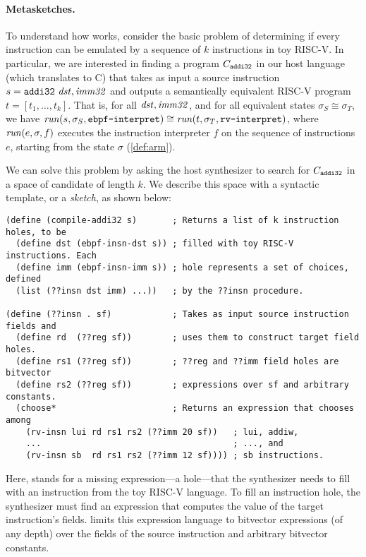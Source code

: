 \paragraph{Metasketches.} 

To understand how \jitsynth works, consider the basic problem of determining if
every  instruction can be emulated by a sequence of $k$ instructions
in toy RISC-V\@. In particular, we are interested in finding a program
$C_{\texttt{addi32}}$ in our host language (which \jitsynth translates to C) that
takes as input a source instruction $s = \texttt{addi32}\ \mathit{dst}, \mathit{imm32}$ and
outputs a semantically equivalent RISC-V program $t = [t_1,\ldots,t_k]$. That
is, for all $\mathit{dst}, \mathit{imm32}$, and for all equivalent states $\sigma_S \cong
\sigma_T$, we have $\mathit{run}(s, \sigma_S,
\texttt{ebpf-interpret})\cong\mathit{run}(t, \sigma_T, \texttt{rv-interpret})$, where
$\mathit{run}(e, \sigma, f)$ executes the instruction interpreter $f$ on the
sequence of instructions $e$, starting from the state $\sigma$
(\autoref{def:arm}).\tighten

We can solve this problem by asking the host synthesizer to search for
$C_{\texttt{addi32}}$ in a space of candidate \minicompilers of length $k$. We
describe this space with a syntactic template, or a \emph{sketch}, as shown below:

\begin{lstlisting}[language=rosette,xleftmargin=0em,mathescape=true,basicstyle=\scriptsize\ttfamily]
(define (compile-addi32 s)       ; Returns a list of k instruction holes, to be 
  (define dst (ebpf-insn-dst s)) ; filled with toy RISC-V instructions. Each    
  (define imm (ebpf-insn-imm s)) ; hole represents a set of choices, defined 
  (list (??insn dst imm) ...))   ; by the ??insn procedure. 

(define (??insn . sf)            ; Takes as input source instruction fields and
  (define rd  (??reg sf))        ; uses them to construct target field holes. 
  (define rs1 (??reg sf))        ; ??reg and ??imm field holes are bitvector 
  (define rs2 (??reg sf))        ; expressions over sf and arbitrary constants.
  (choose*                       ; Returns an expression that chooses among  
    (rv-insn lui rd rs1 rs2 (??imm 20 sf))   ; lui, addiw,
    ...                                      ; ..., and
    (rv-insn sb  rd rs1 rs2 (??imm 12 sf)))) ; sb instructions.
\end{lstlisting}

Here,  stands for a missing expression---a hole---that the
synthesizer needs to fill with an instruction from the toy RISC-V language. To
fill an instruction hole, the synthesizer must find an expression that computes
the value of the target instruction's fields. \jitsynth limits this expression
language to bitvector expressions (of any depth) over the fields of the source
instruction and arbitrary bitvector constants.\tighten

